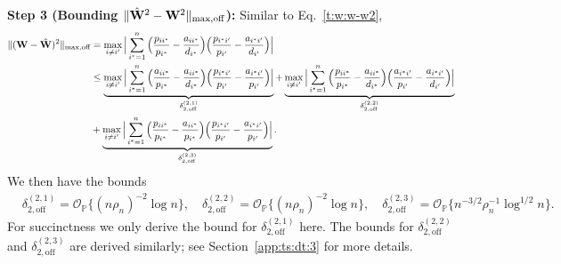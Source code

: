 \documentclass[10pt,journal,compsoc]{IEEEtran}
\newcommand{\op}{\mathcal{O}_{\mathbb{P}}}
\newcommand{\ee}{\end{aligned} \end{equation}}
\newcommand{\BL}{\Big (}
\newcommand{\BR}{\Big )}
\newcommand{\bee}{\begin{equation}\begin{aligned}}
\newcommand{\M}[1]{{{\mathbf{\MakeUppercase{#1}}}}}
\numberwithin{equation}{section}
\begin{document}
\noindent\textbf{Step 3 (Bounding $\|\hat{\M W}^2 - \M W^2\|_{\max,\mathrm{off}}$):} Similar to Eq.~\eqref{t:w:w-w2},
\bee
  \label{t:w-w2:s}
\|(\M W - \hat{\M W})^2\|_{\max,\text{off}}
&=  \max_{i\neq i'}\Big|\sum_{i^* = 1}^{n}\Big(\frac{p_{ii^*}}{p_{i^*}} - \frac{a_{ii^*}}{d_{i^*}}\Big)\Big(\frac{p_{i^*i'}}{p_{i'}} - \frac{a_{i^{*}{i'}}}{d_{i'}}\Big)\Big|
\\
&\leq \underbrace{\max_{i\neq {i'}}\Big|\sum_{i^{*}= 1}^n \BL \frac{a_{ii^*}}{p_{i^*}} - \frac{a_{ii^*}}{d_{i^*}}
\BR\BL\frac{p_{i^*i'}}{p_{i'}} - \frac{a_{i^{*}{i'}}}{p_{i'}} \BR\Big|}_{\delta^{(2,1)}_{2,\text{off}}}
 +\underbrace{\max_{i\neq {i'}}\Big|\sum_{i^* = 1}^{n}\Big(\frac{p_{ii^*}}{p_{i^*}} - \frac{a_{ii^*}}{d_{i^*}}\Big)\BL \frac{a_{i^{*}{i'}}}{p_{i'}} - \frac{a_{i^{*}{i'}}}{d_{i'}}\BR\Big|}_{ \delta^{(2,2)}_{2,\text{off}}}
\\
&+\underbrace{\max_{i\neq {i'}}\Big|\sum_{i^{*}= 1}^{n}\BL\frac{p_{ii^*}}{p_{i^*}} - \frac{a_{ii^*}}{p_{i^*}} \BR\BL\frac{p_{i^*i'}}{p_{i'}} - \frac{a_{i^{*}{i'}}}{p_{i'}} \BR\Big|}_{ \delta^{(2,3)}_{2,\text{off}}}.
\ee
We then have the bounds
\bee
{}&  \delta^{(2,1)}_{2,\text{off}} = \op\bigl\{(n\rho_n)^{-2}{\log
    n}\bigr\}, \quad \delta^{(2,2)}_{2,\text{off}} =
  \op\bigl\{(n\rho_n)^{-2}{\log n}\bigr\}, 
  \quad 
   \delta^{(2,3)}_{2,\text{off}} = \op\big\{n^{-3/2}\rho_n^{-1} \log^{1/2}{n}\big\}.
\ee
For succinctness we only derive the bound for
$\delta^{(2,1)}_{2,\text{off}}$ here. The bounds for
$\delta^{(2,2)}_{2,\text{off}}$ and
$\delta^{(2,3)}_{2,\text{off}}$ are derived similarly; see Section~\ref{app:ts:dt:3} for more details.
\end{document}
